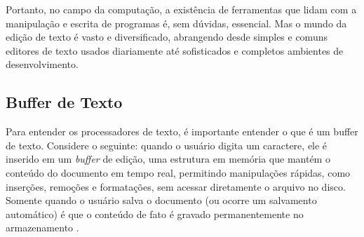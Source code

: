 Portanto, no campo da computação, a existência de ferramentas que lidam com a manipulação e escrita de programas é, sem dúvidas, essencial. Mas o mundo da edição de texto é vasto e diversificado, abrangendo desde simples e comuns editores de texto usados diariamente até sofisticados e completos ambientes de desenvolvimento.

\subsection{Buffer de Texto}

Para entender os processadores de texto, é importante entender o que é um buffer de texto. Considere o seguinte: quando o usuário digita um caractere, ele é inserido em um \textit{buffer} de edição, uma estrutura em memória que mantém o conteúdo do documento em tempo real, permitindo manipulações rápidas, como inserções, remoções e formatações, sem acessar diretamente o arquivo no disco. Somente quando o usuário salva o documento (ou ocorre um salvamento automático) é que o conteúdo de fato é gravado permanentemente no armazenamento \cite{Jacobson1989}.

